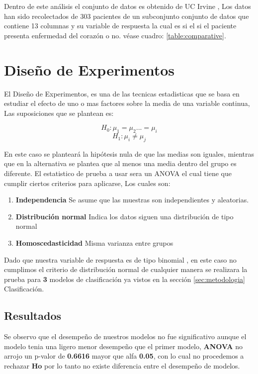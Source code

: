 \documentclass[10pt,journal]{IEEEtran}
\begin{document}
Dentro de este análisis el conjunto de datos es obtenido de UC Irvine \cite{UCI}, Los datos han sido recolectados de 303 pacientes de un subconjunto conjunto de datos que contiene 13 columnas y su variable de respuesta la cual es si el si el paciente presenta enfermedad del corazón o no. véase cuadro: \ref{table:comparative}.

\section{Diseño de Experimentos}

El Diseño de Experimentos, es una de las tecnicas estadisticas que se basa en estudiar el efecto de uno o mas factores sobre la media de una variable continua, Las suposiciones que se plantean es:

\begin{equation}
H_0 : \mu_1 = \mu_2 ... = \mu_i
\end{equation}
\begin{equation}
H_1 : \mu_i \neq \mu_j 
\end{equation}


En este caso se planteará la hipótesis nula de que las medias son iguales, mientras que en la alternativa se plantea que al menos una media dentro del grupo es diferente.
El estatistico de prueba a usar sera un ANOVA el cual tiene que cumplir ciertos criterios para aplicarse, Los cuales son:

\begin{enumerate}
    \item \textbf{Independencia} Se asume que las muestras son independientes y aleatorias.
    \item \textbf{Distribución normal} Indica los datos siguen una distribución de tipo normal
    \item \textbf{Homoscedasticidad} Misma varianza entre grupos 
\end{enumerate}

Dado que nuestra variable de respuesta es de tipo binomial , en este caso no cumplimos el criterio de distribución normal de cualquier manera se realizara la prueba para \textbf{3} modelos de clasificación ya vistos en la sección \ref{sec:metodologia} Clasificación. 

\subsection{Resultados}


Se observo que el desempeño de nuestros modelos no fue significativo aunque el modelo tenia una ligero menor desempeño que el primer modelo, \textbf{ANOVA} no arrojo un p-valor de \textbf{0.6616} mayor que alfa \textbf{0.05}, con lo cual no procedemos a rechazar \textbf{Ho} por lo tanto no existe diferencia entre el desempeño de modelos. 
\end{document}
